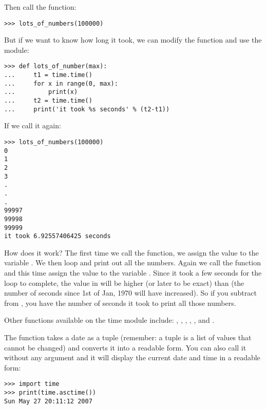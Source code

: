\noindent
Then call the function:

\begin{listing}
\begin{verbatim}
>>> lots_of_numbers(100000)
\end{verbatim}
\end{listing}

\noindent
But if we want to know how long it took, we can modify the function and use the  module:

\begin{listing}
\begin{verbatim}
>>> def lots_of_number(max):
...     t1 = time.time()
...     for x in range(0, max):
...         print(x)
...     t2 = time.time()
...     print('it took %s seconds' % (t2-t1))
\end{verbatim}
\end{listing}

\noindent
If we call it again:

\begin{listingignore}
\begin{verbatim}
>>> lots_of_numbers(100000)
0
1
2
3
.
.
.
99997
99998
99999
it took 6.92557406425 seconds
\end{verbatim}
\end{listingignore}

\noindent
How does it work?  The first time we call the  function, we assign the value to the variable . We then loop and print out all the numbers. Again we call the  function and this time assign the value to the variable . Since it took a few seconds for the loop to complete, the value in  will be higher (or later to be exact) than  (the number of seconds since 1st of Jan, 1970 will have increased). So if you subtract  from , you have the number of seconds it took to print all those numbers.

Other functions available on the time module include: , , , , , and .

The function  takes a date as a tuple (remember: a tuple is a list of values that cannot be changed) and converts it into a readable form. You can also call it without any argument and it will display the current date and time in a readable form:

\begin{listingignore}
\begin{verbatim}
>>> import time
>>> print(time.asctime())
Sun May 27 20:11:12 2007
\end{verbatim}
\end{listingignore}

